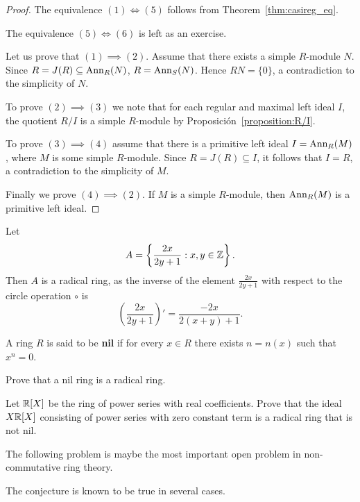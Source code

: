\begin{proof}
	The equivalence $(1)\Longleftrightarrow(5)$ follows from 
	Theorem~\ref{thm:casireg_eq}. 
    
    The equivalence $(5)\Longleftrightarrow(6)$ is left as an exercise. 

	Let us prove that $(1)\implies(2)$. Assume that there exists a simple $R$-module $N$. Since 
	$R=J(R)\subseteq\operatorname{Ann}_R(N)$, $R=\operatorname{Ann}_S(N)$. 
	Hence $RN=\{0\}$, a contradiction to the simplicity of $N$.
	
	To prove $(2)\implies(3)$ we note that for each regular and maximal left ideal 
	$I$, the quotient $R/I$ is a simple $R$-module by
	Proposición~\ref{proposition:R/I}. 
	
	To prove $(3)\implies(4)$ assume that there is a primitive left ideal 
	$I=\operatorname{Ann}_R(M)$, where $M$ is some simple $R$-module. Since $R=J(R)\subseteq I$, it follows that  
    $I=R$, a contradiction to the simplicity of $M$.

	Finally we prove $(4)\implies(2)$. If $M$ is a simple $R$-module, then 
	$\operatorname{Ann}_R(M)$ is a primitive left ideal.
\end{proof}

\begin{example}
	Let 
	\[
	A=\left\{\frac{2x}{2y+1}:x,y\in\mathbb{Z}\right\}.
	\]
	Then $A$ is a radical ring, as the inverse of the element $\frac{2x}{2y+1}$
	with respect to the circle operation 
	$\circ$ is 
	\[
	\left(\frac{2x}{2y+1}\right)'=\frac{-2x}{2(x+y)+1}.
	\]
\end{example}

A ring $R$ is said to be \textbf{nil} if for every $x\in R$ there
exists $n=n(x)$ such that $x^n=0$. 

\begin{exercise}
    Prove that a nil ring is a radical ring. 
\end{exercise}

\begin{exercise}
    Let $\mathbb{R}[X]$ be the ring of power series with real coefficients. Prove that the ideal 
    $X\mathbb{R}[X]$ consisting of power series with zero constant term is a radical ring
    that is not nil. 
\end{exercise}

The following problem is maybe the most important open 
problem in non-commutative ring theory. 


The conjecture is known to be true in several cases.

